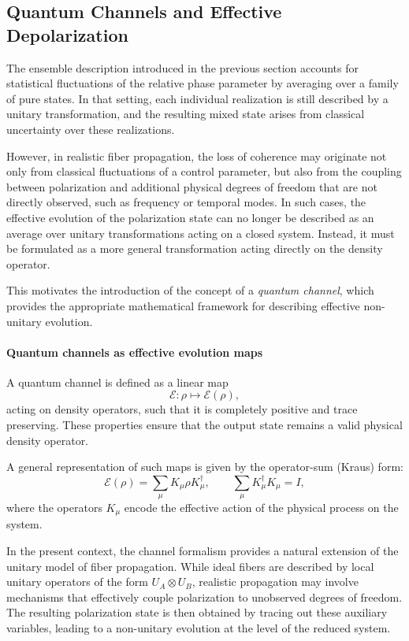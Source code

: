 \documentclass[a4paper]{article}
\begin{document}
\subsection{Quantum Channels and Effective Depolarization}

The ensemble description introduced in the previous section accounts for statistical fluctuations of the relative phase parameter by averaging over a family of pure states. In that setting, each individual realization is still described by a unitary transformation, and the resulting mixed state arises from classical uncertainty over these realizations.

However, in realistic fiber propagation, the loss of coherence may originate not only from classical fluctuations of a control parameter, but also from the coupling between polarization and additional physical degrees of freedom that are not directly observed, such as frequency or temporal modes. In such cases, the effective evolution of the polarization state can no longer be described as an average over unitary transformations acting on a closed system. Instead, it must be formulated as a more general transformation acting directly on the density operator.

\medskip

This motivates the introduction of the concept of a \emph{quantum channel}, which provides the appropriate mathematical framework for describing effective non-unitary evolution.

\paragraph{Quantum channels as effective evolution maps}

A quantum channel is defined as a linear map
\[
\mathcal{E} : \rho \mapsto \mathcal{E}(\rho),
\]
acting on density operators, such that it is completely positive and trace preserving. These properties ensure that the output state remains a valid physical density operator.

A general representation of such maps is given by the operator-sum (Kraus) form:
\[
\mathcal{E}(\rho)
=
\sum_{\mu} K_{\mu} \rho K_{\mu}^\dagger,
\qquad
\sum_{\mu} K_{\mu}^\dagger K_{\mu} = I,
\]
where the operators \(K_{\mu}\) encode the effective action of the physical process on the system.

\medskip

In the present context, the channel formalism provides a natural extension of the unitary model of fiber propagation. While ideal fibers are described by local unitary operators of the form \(U_A \otimes U_B\), realistic propagation may involve mechanisms that effectively couple polarization to unobserved degrees of freedom. The resulting polarization state is then obtained by tracing out these auxiliary variables, leading to a non-unitary evolution at the level of the reduced system.
\end{document}

